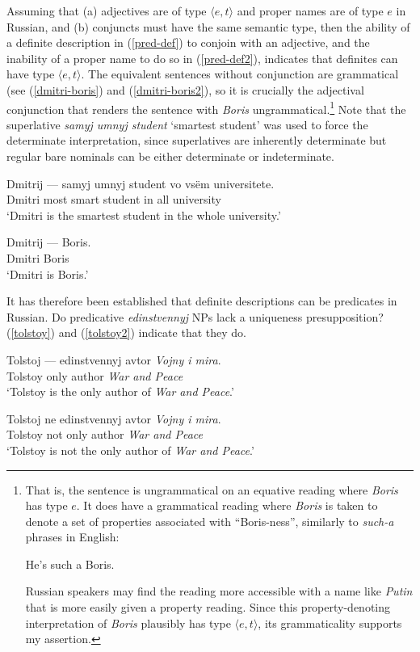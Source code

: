 Assuming that (a) adjectives are of type $\langle e, t \rangle$ and proper names are of type $e$ in Russian, and (b) conjuncts must have the same semantic type, then the ability of a definite description in (\ref{pred-def}) to conjoin with an adjective, and the inability of a proper name to do so in (\ref{pred-def2}), indicates that definites can have type $\langle e, t \rangle$. The equivalent sentences without conjunction are grammatical (see (\ref{dmitri-boris}) and (\ref{dmitri-boris2}), so it is crucially the adjectival conjunction that renders the sentence with \textit{Boris} ungrammatical.\footnote{That is, the sentence is ungrammatical on an equative reading where \textit{Boris} has type $e$. It does have a grammatical reading where \textit{Boris} is taken to denote a set of properties associated with ``Boris-ness'', similarly to \textit{such-a} phrases in English: \begin{exe} \ex He's such a Boris.\end{exe} Russian speakers may find the reading more accessible with a name like \textit{Putin} that is more easily given a property reading. Since this property-denoting interpretation of \textit{Boris} plausibly has type $\langle e, t \rangle$, its grammaticality supports my assertion.} Note that the superlative \textit{samyj umnyj student} `smartest student' was used to force the determinate interpretation, since superlatives are inherently determinate but regular bare nominals can be either determinate or indeterminate.

\begin{exe}
	\ex \label{dmitri-boris} \gll Dmitrij --- samyj umnyj student vo vs\"{e}m universitete.\\
	Dmitri {} most smart student in all university\\
	\glt `Dmitri is the smartest student in the whole university.'

	\ex \label{dmitri-boris2} \gll Dmitrij --- Boris.\\
	Dmitri {} Boris\\
	\glt `Dmitri is Boris.'
\end{exe}

It has therefore been established that definite descriptions can be predicates in Russian. Do predicative \textit{edinstvennyj} NPs lack a uniqueness presupposition? (\ref{tolstoy}) and (\ref{tolstoy2}) indicate that they do.

\begin{exe}
	\ex \label{tolstoy} \gll Tolstoj --- edinstvennyj avtor \textit{Vojny i mira}.\\
	Tolstoy {} only author \textit{War and Peace}\\
	\glt `Tolstoy is the only author of \textit{War and Peace}.'

	\ex \label{tolstoy2} \gll Tolstoj ne edinstvennyj avtor \textit{Vojny i mira}.\\
	Tolstoy not only author \textit{War and Peace}\\
	\glt `Tolstoy is not the only author of \textit{War and Peace}.'
\end{exe}

